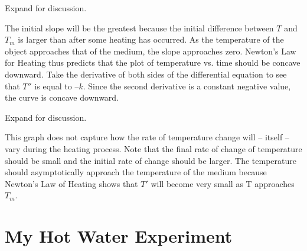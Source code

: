 \documentclass{ximera}
\begin{document}
\begin{problem}
Expand for discussion.

\begin{expandable}
    The initial slope will be the greatest because the initial difference between $T$ and $T_m$ is larger than after some heating has occurred.  As the temperature of the object approaches that of the medium, the slope approaches zero.  Newton’s Law for Heating thus predicts that the plot of temperature vs. time should be concave downward.  Take the derivative of both sides of the differential equation to see that $T''$ is equal to $–k$.  Since the second derivative is a constant negative value, the curve is concave downward.
 \end{expandable}

\begin{center}  
\end{center}

Expand for discussion.

 \begin{expandable}
    This graph does not capture how the rate of temperature change will – itself – vary during the heating process.  Note that the final rate of change of temperature should be small and the initial rate of change should be larger.  The temperature should asymptotically approach the temperature of the medium because Newton’s Law of Heating shows that $T'$ will become very small as T approaches $T_m$.
  \end{expandable}
 
\end{problem}

\section*{My Hot Water Experiment}

\begin{center}  
\end{center}
\end{document}
